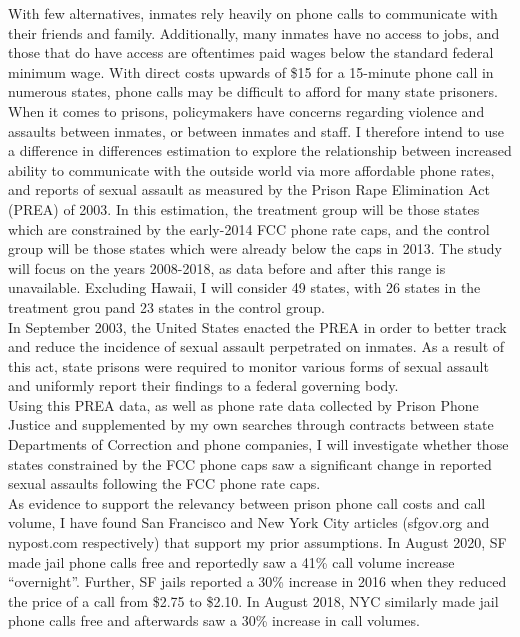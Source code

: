 \documentclass[10pt,a4paper]{article}
\begin{document}
\noindent With few alternatives, inmates rely heavily on phone calls to communicate with their friends and family. Additionally, many inmates have no access to jobs, and those that do have access are oftentimes paid wages below the standard federal minimum wage. With direct costs upwards of \$15 for a 15-minute phone call in numerous states, phone calls may be difficult to afford for many state prisoners. \\

\noindent When it comes to prisons, policymakers have concerns regarding violence and assaults between inmates, or between inmates and staff. I therefore intend to use a difference in differences estimation to explore the relationship between increased ability to communicate with the outside world via more affordable phone rates, and reports of sexual assault as measured by the Prison Rape Elimination Act (PREA) of 2003. In this estimation, the treatment group will be those states which are constrained by the early-2014 FCC phone rate caps, and the control group will be those states which were already below the caps in 2013. The study will focus on the years 2008-2018, as data before and after this range is unavailable. Excluding Hawaii, I will consider 49 states, with 26 states in the treatment grou pand 23 states in the control group. \\ 

\noindent In September 2003, the United States enacted the PREA in order to better track and reduce the incidence of sexual assault perpetrated on inmates. As a result of this act, state prisons were required to monitor various forms of sexual assault and uniformly report their findings to a federal governing body. \\

\noindent Using this PREA data, as well as phone rate data collected by Prison Phone Justice and supplemented by my own searches through contracts between state Departments of Correction and phone companies, I will investigate whether those states constrained by the FCC phone caps saw a significant change in reported sexual assaults following the FCC phone rate caps. \\

\noindent As evidence to support the relevancy between prison phone call costs and call volume, I have found San Francisco and New York City articles (sfgov.org and nypost.com respectively) that support my prior assumptions. In August 2020, SF made jail phone calls free and reportedly saw a 41\% call volume increase ``overnight''. Further, SF jails reported a 30\% increase in 2016 when they reduced the price of a call from \$2.75 to \$2.10. In August 2018, NYC similarly made jail phone calls free and afterwards saw a 30\% increase in call volumes. \\
\end{document}
